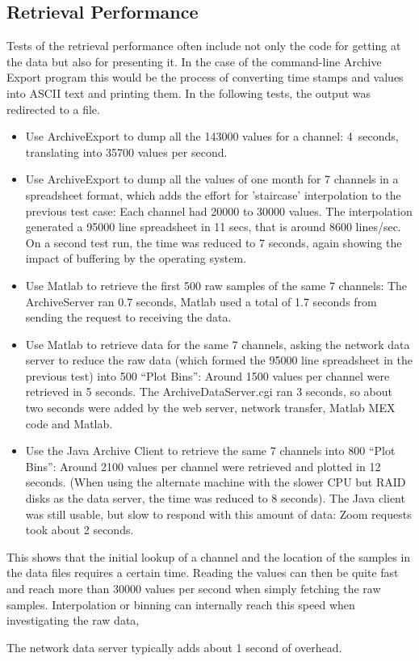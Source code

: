 \subsection{Retrieval Performance}
Tests of the retrieval performance often include not only the
code for getting at the data but also for presenting it. In the
case of the command-line Archive Export program this would be the process
of converting time stamps and values into ASCII text and printing them.
In the following tests, the output was redirected to a file.
\begin{itemize}
\item Use ArchiveExport to dump all the 143000 values for a channel:
      4~seconds, translating into 35700 values per second.
\item Use ArchiveExport to dump all the values of one month for 7
      channels in a spreadsheet format, which adds the effort for
      'staircase' interpolation to the previous test case:
      Each channel had 20000 to 30000 values. The interpolation generated
      a 95000 line spreadsheet in 11 secs, that is around 8600 lines/sec.
      On a second test run, the time was reduced to 7 seconds, again
      showing the impact of buffering by the operating system.
\item Use Matlab to retrieve the first 500 raw samples of the same 7 channels:
      The ArchiveServer ran 0.7 seconds, Matlab used a total of 1.7
      seconds from sending the request to receiving the data.
\item Use Matlab to retrieve data for the same 7 channels,
      asking the network data server to reduce the raw data (which
      formed the 95000 line spreadsheet in the previous test) into
      500 ``Plot Bins'':
      Around 1500 values per channel were retrieved in 5 seconds.
      The ArchiveDataServer.cgi ran 3 seconds, so about two
      seconds were added by the web server, network transfer, Matlab
      MEX code and Matlab.
\item Use the Java Archive Client to retrieve the same 7 channels into 800
      ``Plot Bins'':
      Around 2100 values per channel were retrieved and plotted in 12 seconds.
      (When using the alternate machine with the slower CPU but RAID disks as 
      the data server, the time was reduced to 8 seconds).
      The Java client was still usable, but slow to respond with this
      amount of data: Zoom requests took about 2 seconds.
\end{itemize}

This shows that the initial lookup of a channel and the location
of the samples in the data files requires a certain time.
Reading the values can then be quite fast and reach more than 30000
values per second when simply fetching the raw samples.
Interpolation or binning can internally reach this speed when
investigating the raw data, 

The network data server typically adds about 1 second of overhead.
